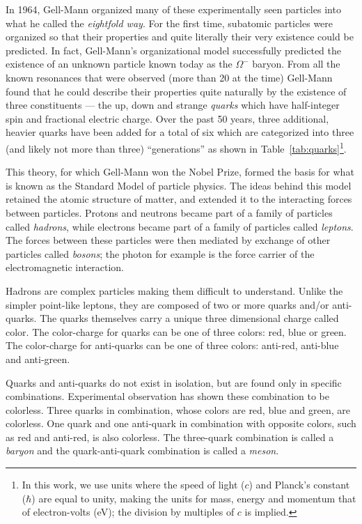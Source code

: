 In 1964, Gell-Mann organized many of these experimentally seen particles into what he called the \emph{eightfold way}. For the first time, subatomic particles were organized so that their properties and quite literally their very existence could be predicted. In fact, Gell-Mann's organizational model successfully predicted the existence\cite{barnes1964} of an unknown particle known today as the $\Omega^-$ baryon. From all the known resonances that were observed (more than 20 at the time) Gell-Mann found that he could describe their properties quite naturally by the existence of three constituents --- the up, down and strange \emph{quarks} which have half-integer spin and fractional electric charge. Over the past 50 years, three additional, heavier quarks have been added for a total of six which are categorized into three (and likely not more than three\cite{DeCamp1989,Blondel2002}) ``generations'' as shown in Table~\ref{tab:quarks}\footnote{In this work, we use units where the speed of light ($c$) and Planck's constant ($\hbar$) are equal to unity, making the units for mass, energy and momentum that of electron-volts (eV); the division by multiples of $c$ is implied.}.


This theory, for which Gell-Mann won the Nobel Prize, formed the basis for what is known as the Standard Model of particle physics. The ideas behind this model retained the atomic structure of matter, and extended it to the interacting forces between particles. Protons and neutrons became part of a family of particles called \emph{hadrons}, while electrons became part of a family of particles called \emph{leptons}. The forces between these particles were then mediated by exchange of other particles called \emph{bosons}; the photon for example is the force carrier of the electromagnetic interaction.

Hadrons are complex particles making them difficult to understand. Unlike the simpler point-like leptons, they are composed of two or more quarks and/or anti-quarks. The quarks themselves carry a unique three dimensional charge called color. The color-charge for quarks can be one of three colors: red, blue or green. The color-charge for anti-quarks can be one of three colors: anti-red, anti-blue and anti-green.

Quarks and anti-quarks do not exist in isolation, but are found only in specific combinations. Experimental observation has shown these combination to be colorless. Three quarks in combination, whose colors are red, blue and green, are colorless. One quark and one anti-quark in combination with opposite colors, such as red and anti-red, is also colorless. The three-quark combination is called a \emph{baryon} and the quark-anti-quark combination is called a \emph{meson}.

